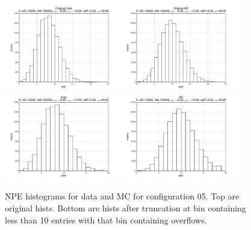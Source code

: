  \begin{figure}[htbp] \begin{center} 
\includegraphics[width=0.45\textwidth]{../FIGURES/05/FIG_Original_Data.pdf} 
\includegraphics[width=0.45\textwidth]{../FIGURES/05/FIG_Original_MC.pdf} 
\includegraphics[width=0.45\textwidth]{../FIGURES/05/FIG_Data.pdf} 
\includegraphics[width=0.45\textwidth]{../FIGURES/05/FIG_MC.pdf} 
\caption{NPE histograms for data and MC for configuration 05. Top are original hists. Bottom are hists after truncation at bin containing less than 10 entries with that bin containing overflows.} 
\label{tab:npe_05} 
\end{center} \end{figure} 

 
